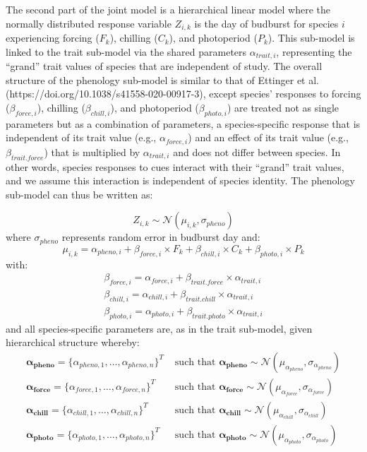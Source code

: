\documentclass{article}\usepackage[]{graphicx}\usepackage[]{color}
\begin{document}
The second part of the joint model is a hierarchical linear model where the normally distributed response variable $Z_{i,k}$ is the day of budburst for species $i$ experiencing forcing ($F_k$), chilling ($C_k$), and photoperiod ($P_k$). This sub-model is linked to the trait sub-model via the shared parameters $\alpha_{trait,i}$, representing the ``grand'' trait values of species that are independent of study. The overall structure of the phenology sub-model is similar to that of Ettinger et al. (https://doi.org/10.1038/s41558-020-00917-3), except species' responses to forcing ($\beta_{force,i}$), chilling ($\beta_{chill,i}$), and photoperiod ($\beta_{photo,i}$) are treated not as single parameters but as a combination of parameters, a species-specific response that is independent of its trait value (e.g., $\alpha_{force,i}$) and an effect of its trait value (e.g., $\beta_{trait.force}$) that is multiplied by $\alpha_{trait,i}$ and does not differ between species. In other words, species responses to cues interact with their ``grand'' trait values, and we assume this interaction is independent of species identity. The phenology sub-model can thus be written as:

\begin{equation}
\label{phen_main}
Z_{i,k}  \sim \mathcal{N}( \mu_{i,k}, \sigma_{pheno})
\end{equation}
where $\sigma_{pheno}$ represents random error in budburst day and:
\begin{equation}
\label{phen_main2}
\mu_{i,k} = \alpha_{pheno,i}+\beta_{force,i} \times F_k + \beta_{chill,i} \times C_k + \beta_{photo,i} \times P_k
\end{equation}
with:
\begin{align}
\label{betaEq}
\beta_{force,i} = \alpha_{force,i} + \beta_{trait.force} \times \alpha_{trait,i} \\
\beta_{chill,i} = \alpha_{chill,i} + \beta_{trait.chill} \times \alpha_{trait,i} \nonumber \\
\beta_{photo,i} = \alpha_{photo,i} + \beta_{trait.photo} \times \alpha_{trait,i} \nonumber 
\end{align} 
and all species-specific parameters are, as in the trait sub-model, given hierarchical structure whereby:
\begin{align}
\boldsymbol{\alpha_{pheno}} = \{\alpha_{pheno,1}, \ldots, \alpha_{pheno,n}\}^T & \text{ such that }
  \boldsymbol{\alpha_{pheno}} \sim \mathcal{N}(\mu_{\alpha_{pheno}},\sigma_{\alpha_{pheno}}) \\
\boldsymbol{\alpha_{force}} = \{\alpha_{force,1}, \ldots, \alpha_{force,n}\}^T & \text{ such that }
  \boldsymbol{\alpha_{force}} \sim \mathcal{N}(\mu_{\alpha_{force}},\sigma_{\alpha_{force}}) \nonumber \\
\boldsymbol{\alpha_{chill}} = \{\alpha_{chill,1}, \ldots, \alpha_{chill,n}\}^T & \text{ such that }
  \boldsymbol{\alpha_{chill}} \sim \mathcal{N}(\mu_{\alpha_{chill}},\sigma_{\alpha_{chill}}) \nonumber \\
\boldsymbol{\alpha_{photo}} = \{\alpha_{photo,1}, \ldots, \alpha_{photo,n}\}^T & \text{ such that }
  \boldsymbol{\alpha_{photo}} \sim \mathcal{N}(\mu_{\alpha_{photo}},\sigma_{\alpha_{photo}}) \nonumber
\end{align}
\end{document}
